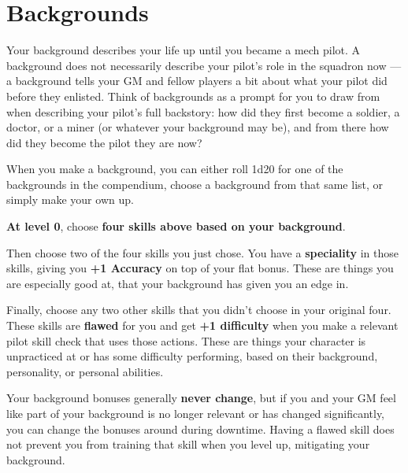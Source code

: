 \section{Backgrounds}

Your background describes your life up until you became a mech pilot. A background does not
necessarily describe your pilot's role in the squadron now — a background tells your GM and
fellow players a bit about what your pilot did before they enlisted. Think of backgrounds as a
prompt for you to draw from when describing your pilot's full backstory: how did they first
become a soldier, a doctor, or a miner (or whatever your background may be), and from there
how did they become the pilot they are now?

When you make a background, you can either roll 1d20 for one of the backgrounds in the
compendium, choose a background from that same list, or simply make your own up.

\textbf{At level 0}, choose \textbf{four skills above based on your background}. 

Then choose two of the four skills you just chose. You have a \textbf{speciality} in those skills, giving
you \textbf{+1 Accuracy} on top of your flat bonus. These are things you are especially good at, that
your background has given you an edge in.

Finally, choose any two other skills that you didn't choose in your original four. These skills are
\textbf{flawed} for you and get \textbf{+1 difficulty} when you make a relevant pilot skill check that uses those
actions. These are things your character is unpracticed at or has some difficulty performing,
based on their background, personality, or personal abilities.

Your background bonuses generally \textbf{never change}, but if you and your GM feel like part of your
background is no longer relevant or has changed significantly, you can change the bonuses
around during downtime. Having a flawed skill does not prevent you from training that skill when
you level up, mitigating your background.